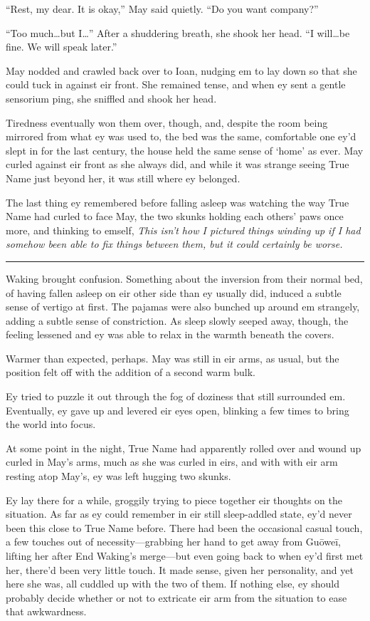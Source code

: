 ``Rest, my dear. It is okay,'' May said quietly. ``Do you want company?''

``Too much\ldots but I\ldots{}'' After a shuddering breath, she shook her head. ``I will\ldots be fine. We will speak later.''

May nodded and crawled back over to Ioan, nudging em to lay down so that she could tuck in against eir front. She remained tense, and when ey sent a gentle sensorium ping, she sniffled and shook her head.

Tiredness eventually won them over, though, and, despite the room being mirrored from what ey was used to, the bed was the same, comfortable one ey'd slept in for the last century, the house held the same sense of `home' as ever. May curled against eir front as she always did, and while it was strange seeing True Name just beyond her, it was still where ey belonged.

The last thing ey remembered before falling asleep was watching the way True Name had curled to face May, the two skunks holding each others' paws once more, and thinking to emself, \emph{This isn't how I pictured things winding up if I had somehow been able to fix things between them, but it could certainly be worse.}

\begin{center}\rule{0.5\linewidth}{0.5pt}\end{center}

Waking brought confusion. Something about the inversion from their normal bed, of having fallen asleep on eir other side than ey usually did, induced a subtle sense of vertigo at first. The pajamas were also bunched up around em strangely, adding a subtle sense of constriction. As sleep slowly seeped away, though, the feeling lessened and ey was able to relax in the warmth beneath the covers.

Warmer than expected, perhaps. May was still in eir arms, as usual, but the position felt off with the addition of a second warm bulk.

Ey tried to puzzle it out through the fog of doziness that still surrounded em. Eventually, ey gave up and levered eir eyes open, blinking a few times to bring the world into focus.

At some point in the night, True Name had apparently rolled over and wound up curled in May's arms, much as she was curled in eirs, and with with eir arm resting atop May's, ey was left hugging two skunks.

Ey lay there for a while, groggily trying to piece together eir thoughts on the situation. As far as ey could remember in eir still sleep-addled state, ey'd never been this close to True Name before. There had been the occasional casual touch, a few touches out of necessity—grabbing her hand to get away from Guōweī, lifting her after End Waking's merge—but even going back to when ey'd first met her, there'd been very little touch. It made sense, given her personality, and yet here she was, all cuddled up with the two of them. If nothing else, ey should probably decide whether or not to extricate eir arm from the situation to ease that awkwardness.

